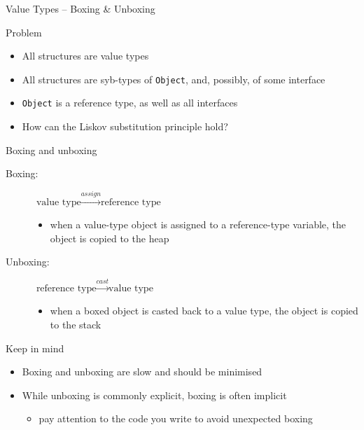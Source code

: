 \documentclass[presentation]{beamer}
\begin{document}
\begin{frame}[allowframebreaks]{Value Types -- Boxing \& Unboxing}
  \begin{block}{Problem}
    \begin{itemize}
      \item All structures are value types
      \item All structures are syb-types of \texttt{Object}, and, possibly, of some interface
      \item \texttt{Object} is a reference type, as well as all interfaces
      \item How can the Liskov substitution principle hold?
    \end{itemize}
  \end{block}

  \begin{exampleblock}{Boxing and unboxing}
    \begin{description}
      \item[Boxing:] $\text{value type} \xrightarrow{assign} \text{reference type}$
      \begin{itemize}
        \item when a value-type object is \alert{assigned} to a reference-type variable, the object is \alert{copied to the heap}
      \end{itemize} 
      \item[Unboxing:] $\text{reference type} \xrightarrow{cast} \text{value type}$
      \begin{itemize}
        \item when a boxed object is \alert{casted} back to a value type, the object is \alert{copied to the stack}
      \end{itemize}  
    \end{description}
  \end{exampleblock}

  \begin{alertblock}{Keep in mind}
    \begin{itemize}
      \item Boxing and unboxing are \alert{slow} and should be minimised
      \item While unboxing is commonly explicit, boxing is often implicit
      \begin{itemize}
        \item pay attention to the code you write to avoid unexpected boxing
      \end{itemize}
    \end{itemize}
  \end{alertblock}


\end{frame}
\end{document}
